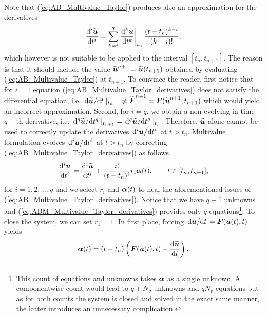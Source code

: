 Note that (\ref{eq:AB_Multivalue_Taylor}) produces also an approximation for the derivatives
%
\begin{align}
	\dv[i]{ \widetilde{\vect{u}} }{t}
	=
	\sum_{k = i}^{q}
	\eval{ \dv[k]{ \vect{u} }{t} }_{t_n}
	\frac{(t-t_n)^{k-i}}{(k-i)!}
	,
	\label{eq:AB_Multivalue_Taylor_derivatives}
\end{align}
which however is not suitable to be applied to the interval $[t_n,t_{n+1}]$. The reason is that it should include the value $\widetilde{\boldsymbol{u}}^{n+1}= \widetilde{\boldsymbol{u}}(t_{n+1})$ obtained by evaluating (\ref{eq:AB_Multivalue_Taylor}) at $t_{n+1}$. To convince the reader, first notice that for $i=1$ equation (\ref{eq:AB_Multivalue_Taylor_derivatives}) does not satisfy the differential equation, i.e. $	\dv*{ \widetilde{\boldsymbol{u}} }{t}|_{t_{n+1}}\ne \widetilde{\boldsymbol{F}}^{n+1} = \boldsymbol{F}(\widetilde{\boldsymbol{u}}^{n+1},t_{n+1})$ which would yield an incorrect approximation. Second, for $i=q$, we obtain a non evolving in time $q-$th derivative, i.e. $	\dv*[q]{ \widetilde{\boldsymbol{u}} }{t}|_{t_{n+1}} = \dv*[q]{ \widetilde{\boldsymbol{u}} }{t}|_{t_{n}}$. Therefore, $\widetilde{\boldsymbol{u}}$ alone cannot be used to correctly update the derivatives $\dv*[i]{ \boldsymbol{u} }{t}$ at $t>t_{n}$. Multivalue formulation evolves $\dv*[i]{ \boldsymbol{u} }{t}$ at $t>t_{n}$ by correcting (\ref{eq:AB_Multivalue_Taylor_derivatives}) as follows
%
\begin{align}
	\dv[i]{ \boldsymbol{u} }{t}
	=
	\dv[i]{ \widetilde{\boldsymbol{u}} }{t}
	+
	\frac{i!}{(t-t_n)^{i}} 
	r_i
	\boldsymbol{\alpha}(t)
	,
	\qquad
	t\in[t_n,t_{n+1}],
	\label{eq:ABM_Multivalue_Taylor_derivatives}
\end{align}
for $i=1,2,\ldots,q$ and we select $r_i$ and $\boldsymbol{\alpha}(t)$ to heal the aforementioned issues of (\ref{eq:AB_Multivalue_Taylor_derivatives}). Notice that we have $q+1$ unknowns and (\ref{eq:ABM_Multivalue_Taylor_derivatives}) provides only $q$ equations\footnote{This count of equations and unknowns takes $\boldsymbol{\alpha}$ as a single unknown. A componentwise count would lead to $q+N_v$ unknowns and $qN_v$ equations but as for both counts the system is closed and solved in the exact same manner, the latter introduces an unnecessary complication.}. To close the system, we can set $r_1=1$. In first place, forcing $\dv*{ \boldsymbol{u} }{t}=\boldsymbol{F}(\boldsymbol{u}(t),t)$ yields
%
\begin{align}
	\boldsymbol{\alpha}(t) 
	=
	(t-t_n)
	\left(
	\boldsymbol{F}(\boldsymbol{u}(t),t)
	-
	\dv{\widetilde{\boldsymbol{u}}}{t}
	\right).
	\label{eq:ABM_Multivalue_alpha}
\end{align}

